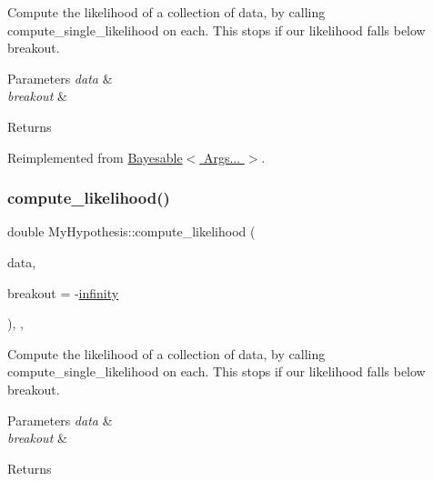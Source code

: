 Compute the likelihood of a collection of data, by calling compute\+\_\+single\+\_\+likelihood on each. This stops if our likelihood falls below breakout. 


\begin{DoxyParams}{Parameters}
{\em data} & \\
\hline
{\em breakout} & \\
\hline
\end{DoxyParams}
\begin{DoxyReturn}{Returns}

\end{DoxyReturn}


Reimplemented from \hyperlink{class_bayesable_a202493156cec15937bee304d807fdbdb}{Bayesable$<$ Args... $>$}.

\mbox{\label{class_my_hypothesis_a42d7d139cd23f30342e1393fd0873dd1}} 
\subsubsection{\texorpdfstring{compute\+\_\+likelihood()}{compute\_likelihood()}\hspace{0.1cm}{\footnotesize\ttfamily [2/2]}}
{\footnotesize\ttfamily double My\+Hypothesis\+::compute\+\_\+likelihood (\begin{DoxyParamCaption}\item[{const \hyperlink{class_bayesable_aa2788c4d7718c0a824e1d28c4c98f921}{data\+\_\+t} \&}]{data,  }\item[{const double}]{breakout = {\ttfamily -\/\hyperlink{_numerics_8h_a1bb1e42ae1b40cad6e99da0aab8a5576}{infinity}} }\end{DoxyParamCaption})\hspace{0.3cm}{\ttfamily [inline]}, {\ttfamily [override]}, {\ttfamily [virtual]}}



Compute the likelihood of a collection of data, by calling compute\+\_\+single\+\_\+likelihood on each. This stops if our likelihood falls below breakout. 


\begin{DoxyParams}{Parameters}
{\em data} & \\
\hline
{\em breakout} & \\
\hline
\end{DoxyParams}
\begin{DoxyReturn}{Returns}

\end{DoxyReturn}


